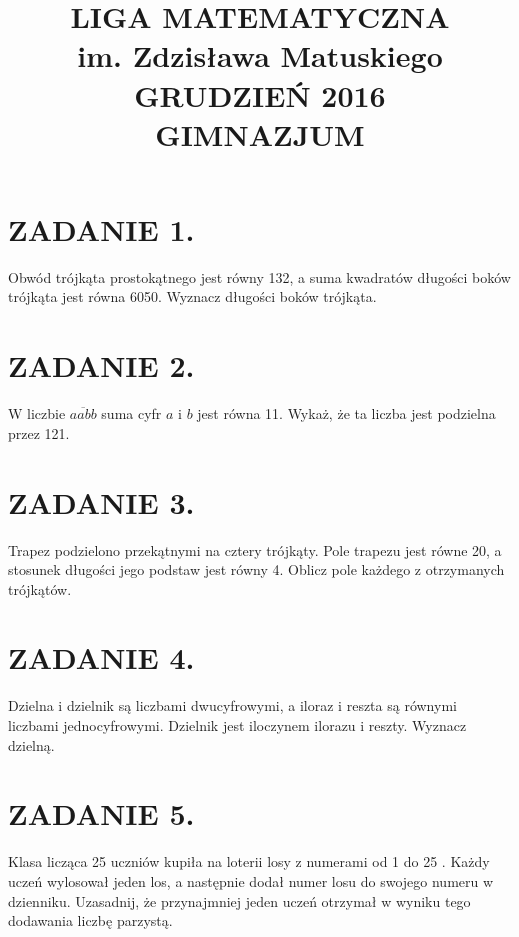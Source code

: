 \documentclass[10pt]{article}
\title{LIGA MATEMATYCZNA \\
 im. Zdzisława Matuskiego \\
 GRUDZIEŃ 2016 \\
 GIMNAZJUM }
\author{}
\date{}
\begin{document}
\maketitle
\section*{ZADANIE 1.}
Obwód trójkąta prostokątnego jest równy 132, a suma kwadratów długości boków trójkąta jest równa 6050. Wyznacz długości boków trójkąta.

\section*{ZADANIE 2.}
W liczbie \(\overline{a a b b}\) suma cyfr \(a\) i \(b\) jest równa 11. Wykaż, że ta liczba jest podzielna przez 121.

\section*{ZADANIE 3.}
Trapez podzielono przekątnymi na cztery trójkąty. Pole trapezu jest równe 20, a stosunek długości jego podstaw jest równy 4. Oblicz pole każdego z otrzymanych trójkątów.

\section*{ZADANIE 4.}
Dzielna i dzielnik są liczbami dwucyfrowymi, a iloraz i reszta są równymi liczbami jednocyfrowymi. Dzielnik jest iloczynem ilorazu i reszty. Wyznacz dzielną.

\section*{ZADANIE 5.}
Klasa licząca 25 uczniów kupiła na loterii losy z numerami od 1 do 25 . Każdy uczeń wylosował jeden los, a następnie dodał numer losu do swojego numeru w dzienniku. Uzasadnij, że przynajmniej jeden uczeń otrzymał w wyniku tego dodawania liczbę parzystą.
\end{document}
